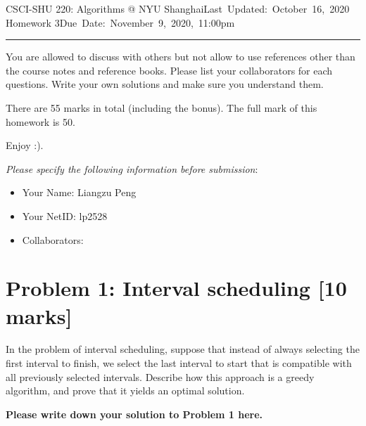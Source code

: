 \documentclass[11pt,twoside]{article}
\makeatletter
\newcommand{\homework}[1]{
   \pagestyle{myheadings}
   \thispagestyle{plain}
   \newpage
   \setcounter{page}{1}
   \noindent
   \classname \hfill \mbox{\updatedday} \\
   \instname \hfill \mbox{\duedate}
   \rule{6.5in}{0.5mm}
   \vspace*{-0.1 in}
}
\newcommand{\problem}[1]{\section*{Problem #1}}
\def\classname{CSCI-SHU 220: Algorithms @ NYU Shanghai}
\def\updatedday{Last Updated: October 16, 2020}
\def\duedate{Due Date: November 9, 2020, 11:00pm}
\newenvironment{solution}{{\par\noindent\it Solution.}}{}
\def\instname{Homework 3}
\makeatother
\begin{document}
\homework{3}

You are allowed to discuss with others but not allow to use references other than the course notes and reference books. Please list your collaborators for each questions. Write your own solutions and make sure you understand them. 

There are 55 marks in total (including the bonus). The full mark of this homework is 50.  

Enjoy :). 

\textit{Please specify the following information before submission}:
\begin{itemize}
    \item Your Name: Liangzu Peng%
    \item Your NetID: lp2528%
    \item Collaborators: %
\end{itemize}

\problem{1: Interval scheduling [10 marks]} 
In the problem of interval scheduling, suppose that instead of always selecting the first interval to finish, we select the last interval to start that is compatible with all previously selected intervals. Describe how this approach is a greedy algorithm, and prove that it yields an optimal solution.

\begin{solution}
\textbf{Please write down your solution to Problem 1 here.}
\end{solution}
\end{document}
